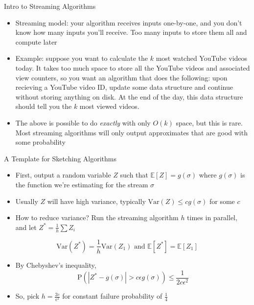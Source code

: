 \begin{frame}{Intro to Streaming Algorithms}
\protect\hypertarget{intro-to-streaming-algorithms}{}
\begin{itemize}
\tightlist
\item
  Streaming model: your algorithm receives inputs one-by-one, and you
  don't know how many inputs you'll receive. Too many inputs to store
  them all and compute later
\item
  Example: suppose you want to calculate the \(k\) most watched YouTube
  videos today. It takes too much space to store all the YouTube videos
  and associated view counters, so you want an algorithm that does the
  following: upon recieving a YouTube video ID, update some data
  structure and continue without storing anything on disk. At the end of
  the day, this data structure should tell you the \(k\) most viewed
  videos.
\item
  The above is possible to do \emph{exactly} with only \(O(k)\) space,
  but this is rare. Most streaming algorithms will only output
  approximates that are good with some probability
\end{itemize}
\end{frame}

\begin{frame}{A Template for Sketching Algorithms}
\protect\hypertarget{a-template-for-sketching-algorithms}{}
\begin{itemize}
\tightlist
\item
  First, output a random variable \(Z\) such that
  \(\mathbb{E}[Z] = g(\sigma)\) where \(g(\sigma)\) is the function
  we're estimating for the stream \(\sigma\)
\item
  Usually \(Z\) will have high variance, typically
  \(\text{Var}(Z) \leq c g(\sigma)\) for some \(c\)
\item
  How to reduce variance? Run the streaming algorithm \(h\) times in
  parallel, and let \(Z^* = \frac{1}{h}\sum Z_i\)
\end{itemize}

\[\text{Var}(Z^*) = \frac{1}{h}\text{Var}(Z_1) \text{ and }\mathbb{E}[Z^*] = \mathbb{E}[Z_1]\]

\begin{itemize}
\tightlist
\item
  By Chebyshev's inequality,
  \[\text{P}\left(|Z^* - g(\sigma)| > c\epsilon g(\sigma) \right) \leq \frac{1}{2c\epsilon^2} \]
\item
  So, pick \(h = \frac{2c}{\epsilon^2}\) for constant failure
  probability of \(\frac{1}{4}\)
\end{itemize}
\end{frame}

